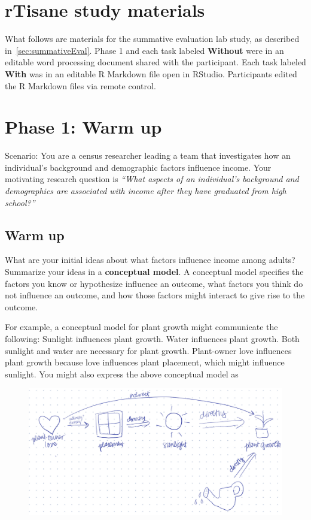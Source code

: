 \section{rTisane study materials} \label{appendix:summativeEvaluation} 

What follows are materials for the summative evaluation lab study, as described
in~\autoref{sec:summativeEval}. Phase 1 and each task labeled \textbf{Without \rTisane}
were in an editable word processing document shared with the participant. Each
task labeled \textbf{With \rTisane} was in an editable R Markdown file open in RStudio.
Participants edited the R Markdown files via remote control. 

\clearpage 
\section*{Phase 1: Warm up}
Scenario: You are a census researcher leading a team that investigates how an
individual’s background and demographic factors influence income. Your
motivating research question is \textit{``What aspects of an individual’s background and
demographics are associated with income after they have graduated from high
school?''}

\subsection*{Warm up}

What are your initial ideas about what factors influence income among adults?
Summarize your ideas in a \textbf{conceptual model}. A conceptual model specifies the
factors you know or hypothesize influence an outcome, what factors you think do
not influence an outcome, and how those factors might interact to give rise to
the outcome. 

For example, a conceptual model for plant growth might communicate
the following: Sunlight influences plant growth. Water influences plant growth.
Both sunlight and water are necessary for plant growth. Plant-owner love
influences plant growth because love influences plant placement, which might
influence sunlight. You might also express the above conceptual model as

\begin{figure}[H]
    \centering
    \includegraphics[width=.85\linewidth]{tisane/figures/example-conceptual-model.png}
\end{figure}

